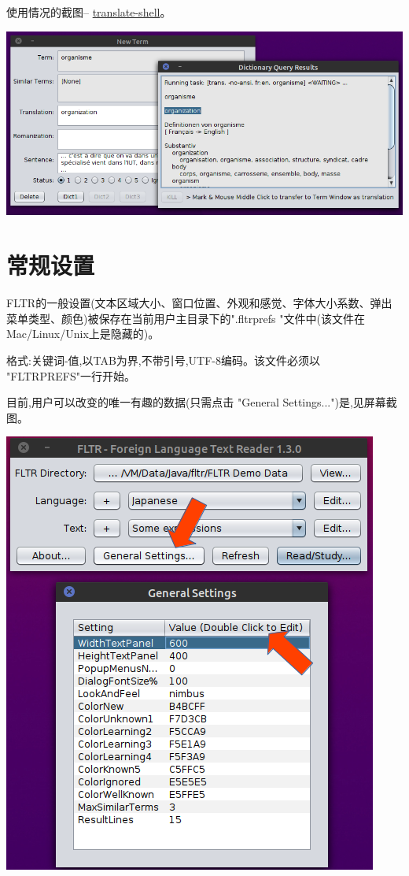 \documentclass[cn,10pt,math=newtx,citestyle=gb7714-2015,bibstyle=gb7714-2015]{elegantbook}
\newcommand{\translateshell}{\href{https://github.com/soimort/translate-shell}{translate-shell}}
\begin{document}
使用情况的截图-- \translateshell。

\includegraphics[scale=0.4]{image/images-033.png}


\chapter{常规设置}
\label{常规设置}
FLTR的一般设置(文本区域大小、窗口位置、外观和感觉、字体大小系数、弹出菜单类型、颜色)被保存在当前用户主目录下的".fltrprefs "文件中(该文件在Mac/Linux/Unix上是隐藏的)。

格式:关键词-值,以TAB为界,不带引号,UTF-8编码。该文件必须以 "FLTRPREFS"一行开始。

目前,用户可以改变的唯一有趣的数据(只需点击 "General Settings...")是,见屏幕截图。

\includegraphics[scale=0.8]{image/images-034.png}
\end{document}
